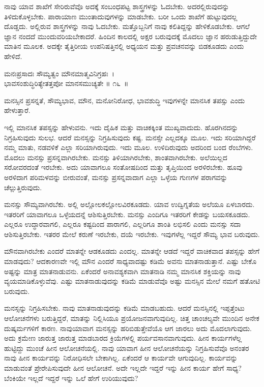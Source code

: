 ನಾವು ಯಾವ ಶಾಖೆಗೆ ಸೇರಿರುವೆವೊ ಅದಕ್ಕೆ ಸಂಬಂಧಪಟ್ಟ ಶಾಸ್ತ್ರಗಳನ್ನು ಓದಬೇಕು. ಅದರಲ್ಲಿರುವುದನ್ನು ತಿಳಿದುಕೊಳ್ಳಬೇಕು. ಪಾರಾಯಾಣ ಮುಂತಾದುವುಗಳನ್ನು ಮಾಡಬೇಕು. ಬರೀ ಒಂದು ಶಾಖೆಗೆ ಹುಟ್ಟುವುದಲ್ಲ ದೊಡ್ಡದು. ಅಲ್ಲಿರುವ ಶಾಸ್ತ್ರಗಳನ್ನು ನಾವು ಓದಬೇಕು. ಮತ್ತೊಬ್ಬನಿಗೆ ನಾವು ಕಲಿತಿದ್ದನ್ನು ಹೇಳಿಕೊಡಬೇಕು. ಆಗಲೆ ಜ್ಞಾನ ನಂದದೆ ಮುಂದುವರಿಯ\-ಬೇಕಾದರೆ. ಹಿಂದಿನ ಕಾಲದಲ್ಲಿ ಅಕ್ಷರ ಬರುವುದಕ್ಕೆ ಮೊದಲು ಜ್ಞಾನ ಹರುಡುತ್ತಿದ್ದುದೇ ಮಾತಿನ ಮೂಲಕ. ಅದಕ್ಕೇ ತೈತ್ತಿರೀಯ ಉಪನಿಷತ್ತಿನಲ್ಲಿ ಅಧ್ಯಯನ ಮತ್ತು ಪ್ರವಚನವನ್ನು ಬಿಡಕೂಡದು ಎಂದು ಹೇಳಿದೆ.

\begin{shloka}
ಮನಃಪ್ರಸಾದಃ ಸೌಮ್ಯತ್ವಂ ಮೌನಮಾತ್ಮವಿನಿಗ್ರಹಃ~।\\ಭಾವಸಂಶುದ್ಧಿರಿತ್ಯೇತತ್ತಪೋ ಮಾನಸಮುಚ್ಯತೇ \hfill॥ ೧೬~॥
\end{shloka}

\begin{artha}
ಮನಸ್ಸಿನ ಪ್ರಸನ್ನತೆ, ಸೌಮ್ಯಭಾವ, ಮೌನ, ಮನೋನಿರೋಧ, ಭಾವಶುದ್ಧಿ ಇವುಗಳನ್ನೇ ಮಾನಸಿಕ ತಪಸ್ಸು ಎಂದು ಹೇಳುತ್ತಾರೆ.
\end{artha}

ಇಲ್ಲಿ ಮಾನಸಿಕ ತಪಸ್ಸನ್ನು ಹೇಳುವನು. ಇದು ದೈಹಿಕ ಮತ್ತು ವಾಚಿಕಕ್ಕಿಂತ ಮುಖ್ಯವಾದುದು. ಹೊರಗಿನದನ್ನು ನಿಗ್ರಹಿಸುವುದು ಸುಲಭ. ಆದರೆ ಮನಸ್ಸನ್ನು ನಿಗ್ರಹಿಸುವುದು ಕಷ್ಟ. ಮನಸ್ಸೇ ಎಲ್ಲದಕ್ಕೂ ಮೂಲ. ಇದು ಸರಿಯಾಗಿದ್ದರೆ ನಮ್ಮ ಮಾತು, ನಡವಳಿಕೆ ಎಲ್ಲಾ ಸರಿಯಾಗಿರುವುದು. ಇದು ಮೂಲ. ಉಳಿದಿರುವುದು ಅದರಿಂದ ಬಂದ ರೆಂಬೆಗಳು. ಮೊದಲು ಮನಸ್ಸು ಪ್ರಸನ್ನವಾಗಿರಬೇಕು. ಮನಸ್ಸು ತಿಳಿಯಾಗಿರಬೇಕು, ಶಾಂತವಾಗಿರಬೇಕು. ಅಲೆಯಿಲ್ಲದ ಸರೋವರದಂತೆ ಇರಬೇಕು. ಅದು ಯಾವಾಗಲೂ ಸಂತೋಷದಿಂದ ಮತ್ತು ತೃಪ್ತಿಯಿಂದ ಅರಳಿರಬೇಕು. ಹೂವು ಅರಳಿದಾಗ ಪರಿಮಳವನ್ನು ಬೀರುವಂತೆ, ಮನಸ್ಸು ಪ್ರಸನ್ನವಾದಾಗ ಎಲ್ಲಾ ಒಳ್ಳೆಯ ಗುಣಗಳ ಪರಾಗವನ್ನು ಚೆಲ್ಲುತ್ತಿರುವುದು.

ಮನಸ್ಸು ಸೌಮ್ಯವಾಗಿರಬೆಕು. ಅಲ್ಲಿ ಅಲ್ಲೋಲಕಲ್ಲೋಲವಿರಕೂಡದು. ಯಾವ ಉದ್ವಿಗ್ನತೆಯ ಅಲೆಯೂ ಏಳಬಾರದು. ಇತರರಿಗೆ ಯಾವಾಗಲೂ ಒಳ್ಳೆಯದನ್ನೆ ಆಶಿಸುತ್ತಿರಬೇಕು. ಮನಸ್ಸು ಎಂದಿಗೂ ಇತರರಿಗೆ ಕೇಡನ್ನು ಬಯಸಕೂಡದು. ಎಲ್ಲರೂ ಉದ್ಧಾರವಾಗಲಿ, ಎಲ್ಲರೂ ಕಷ್ಟದಿಂದ ಪಾರಾಗಲಿ, ಎಲ್ಲರಿಗೂ ಶಾಂತಿ ಲಭಿಸಲಿ ಎಂದು ಮನಸ್ಸು ಸದಾ ಆಶಿಸುತ್ತಿರಬೇಕು. ಇತರರ ಮೇಲೆ ಕರುಣೆ ಇರಬೇಕು, ದಯೆ ಇರಬೇಕು. ಇವುಗಳೆಲ್ಲ ಇದ್ದರೆ ಸೌಮ್ಯ ಭಾವ ಬರುವುದು.

ಮೌನವಾಗಿರಬೇಕು ಎಂದರೆ ಮಾತನ್ನೇ ಆಡಕೂಡದು ಎಂದಲ್ಲ. ಮಾತನ್ನೇ ಆಡದೆ ಇದ್ದರೆ ವಾಚಿಕವಾದ ತಪಸ್ಸನ್ನು ಹೇಗೆ ಮಾಡವುದು? ಆದಕಾರಣವೇ ಇಲ್ಲಿ ಮೌನ ಎಂದರೆ ಸಾಧ್ಯವಾದಷ್ಟು ಕಡಿಮೆ ಅವನು ಮಾತ\-ನಾಡುತ್ತಾನೆ. ಎಷ್ಟು ಬೇಕೊ ಅಷ್ಟನ್ನು ಮಾತ್ರ ಮಾತನಾಡು\-ವನು. ಏಕೆಂದರೆ ಅನಾವಶ್ಯಕವಾಗಿ ಮಾತನಾಡಿ ನಮ್ಮ ಮಾನಸಿಕ ಶಕ್ತಿಯನ್ನು ನಾವು ವ್ಯಯಮಾಡಿ\-ಕೊಳ್ಳುವೆವು. ಎಷ್ಟು ಮಾತನಾಡುವುದನ್ನು ಕಡಿಮೆ ಮಾಡುವೆವೊ ಅಷ್ಟು ಮನಸ್ಸಿನ ಮೇಲೆ ನಮಗೆ ಹತೋಟಿ ಬರುವುದು.

ಮನಸ್ಸನ್ನು ನಿಗ್ರಹಿಸಬೇಕು. ನಾವು ಮಾತನಾಡುವುದನ್ನು ಕಡಿಮೆ ಮಾಡಬಹುದು. ಆದರೆ ಮನಸ್ಸಿನಲ್ಲಿ ಇಪ್ಪತ್ತೆಂಟು ಆಲೋಚನೆಗಳು ಬರುತ್ತಿದ್ದರೆ, ಮಾತನ್ನು ನಿಲ್ಲಿಸಿಯೂ ಪ್ರಯೋಜನವಾಗುವುದಿಲ್ಲ. ಚಿತ್ತ ಚಾಂಚಲ್ಯವೇ ಮುಂದಿನ ಅನೇಕ ದುಷ್ಕರ್ಮಗಳಿಗೆ ಕಾರಣ. ನಾವು\break ಯಾವಾಗ ಮನಸ್ಸನ್ನು ಹರಿಬಿಡುತ್ತೇವೆಯೊ ಆಗ ಜಾರಲು ಅದು ಮೊದಲಾಗುವುದು. ಅದು ಕ್ರಮೇಣ ಜಾರುತ್ತ ಜಾರುತ್ತ ಮಾಡಬಾರದ ಕ್ರಿಯೆಗಳಲ್ಲಿ ಪರ್ಯವಸಾನವಾಗುವುದು. ಹೀನ ಕಾರ್ಯಗಳೆಲ್ಲ ಹುಟ್ಟಿದ್ದು ಮುಂಚೆ ಹೀನ ಆಲೋಚನೆಯಲ್ಲಿ. ನಾವು ಯಾವಾಗ ಹೀನ ಆಲೋಚನೆಯನ್ನು ನಿಗ್ರಹಿಸುವೆವೊ ಅನಂತರ ನಾವು ಹೀನ ಕಾರ್ಯವನ್ನು ನಿರೋಧಿಸಲೇ ಬೇಕಾಗಿಲ್ಲ. ಏಕೆಂದರೆ ಆ ಕಾರ್ಯವೇ ಆಗುವುದಿಲ್ಲ. ಕಾರ್ಯವನ್ನು ಮಾಡುವಂತೆ ಪ್ರೇರೇಪಿಸುವುದೇ ಹೀನ ಆಲೋಚನೆ. ಅದೇ ಇಲ್ಲದೇ ಇದ್ದರೆ ಇನ್ನು ಹೀನ ಕಾರ್ಯ ಹೇಗೆ ಸಾಧ್ಯ? ಬೆಂಕಿಯೇ ಇಲ್ಲದೆ ಇದ್ದರೆ ಇನ್ನು ಒಲೆ ಹೇಗೆ ಉರಿಯುವುದು?

